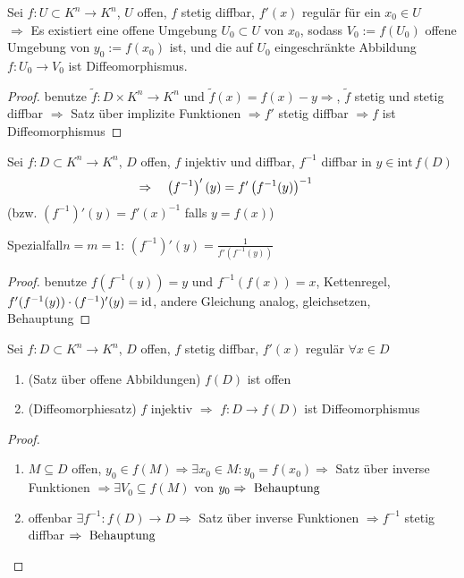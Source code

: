 \begin{theorem}
	Sei $f:U\subset K^n\to K^n$, $U$ offen, $f$ stetig diffbar, $f'(x)$ regulär für ein $x_0\in U$ \\
	$\Rightarrow$ Es existiert eine offene Umgebung $U_0\subset U$ von $x_0$, sodass $V_0:= f(U_0)$ offene Umgebung von $y_0 := f(x_0)$ ist, und die auf $U_0$ eingeschränkte Abbildung $f:U_0\to V_0$ ist Diffeomorphismus.
\end{theorem}
\begin{proof}
	benutze $\tilde{f}:D\times K^n\to K^n$ und $\tilde{f}(x)=f(x)-y\Rightarrow$, $\tilde{f}$ stetig und stetig diffbar $\Rightarrow$ Satz über implizite Funktionen $\Rightarrow f'$ stetig diffbar $\Rightarrow f$ ist Diffeomorphismus
\end{proof}

\begin{proposition}
	Sei $f:D\subset K^n\to K^n$, $D$ offen, $f$ injektiv und \gls{diffbar}, $f^{-1}$ \gls{diffbar} in $y\in \mathrm{int}\, f(D)$ \begin{align}
		\Rightarrow \quad\left(f^{-1}\right)'(y) &= f'\left( f^{-1}(y)\right)^{-1}\notag
	\end{align}
	(bzw. $(f^{-1})'(y) = f'(x)^{-1}$ falls $y=f(x)$)
	
	Spezialfall$ n = m = 1$: $(f^{-1})'(y) = \frac{1}{f'(f^{-1}(y))}$
\end{proposition}

\begin{proof}
	benutze $f(f^{-1}(y))=y$ und $f^{-1}(f(x))=x$, Kettenregel, $f'(f^{-1}(y))\cdot (f^{-1})'(y)=\operatorname{id}$, andere Gleichung analog, gleichsetzen, Behauptung
\end{proof}

\begin{proposition}
	Sei $f:D\subset K^n\to K^n$, $D$ offen, $f$ stetig diffbar, $f'(x)$ regulär $\forall x\in D$
	\begin{enumerate}[label={(\alph*)}]
		\item (Satz über offene Abbildungen) $f(D)$ ist offen
		\item (Diffeomorphiesatz) $f$ injektiv $\Rightarrow$ $f:D\to f(D)$ ist Diffeomorphismus
	\end{enumerate}
\end{proposition}

\begin{proof}\hspace*{0pt}
	\begin{enumerate}[label={(\alph*)}]
		\item $M\subseteq D$ offen, $y_0\in f(M)\Rightarrow\exists x_0\in M:y_0=f(x_0)\Rightarrow$ Satz über inverse Funktionen $\Rightarrow\exists V_0\subseteq f(M)$ von $y_0\Rightarrow \text{ Behauptung}$
		\item offenbar $\exists f^{-1}:f(D)\to D\Rightarrow$ Satz über inverse Funktionen $\Rightarrow f^{-1}$ stetig diffbar $\Rightarrow \text{ Behauptung}$
	\end{enumerate}
\end{proof}